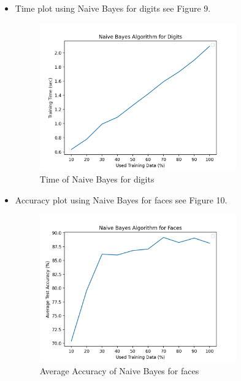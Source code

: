 \documentclass{article}
\begin{document}
\begin{itemize}
    \item Time plot using Naive Bayes for digits see Figure 9.
    \begin{figure}
        \centering
        \includegraphics[width=0.8\textwidth]{nbDiTime.png}
        \caption{Time of Naive Bayes for digits}
    \end{figure}
    
    \item Accuracy plot using Naive Bayes for faces see Figure 10.
    \begin{figure}
        \centering
        \includegraphics[width=0.8\textwidth]{nbFa.png}
        \caption{Average Accuracy of Naive Bayes for faces}
    \end{figure}
    

\end{itemize}
\end{document}
